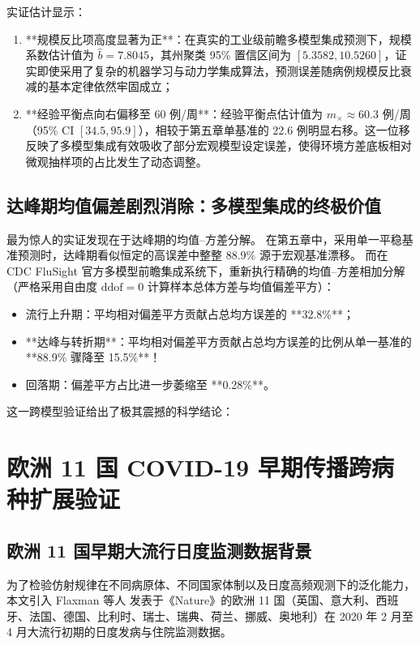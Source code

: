 实证估计显示：
\begin{enumerate}[label=(\arabic*)]
    \item **规模反比项高度显著为正**：在真实的工业级前瞻多模型集成预测下，规模系数估计值为 $\hat{b} = 7.8045$，其州聚类 95\% 置信区间为 $[5.3582, 10.5260]$，证实即使采用了复杂的机器学习与动力学集成算法，预测误差随病例规模反比衰减的基本定律依然牢固成立；
    \item **经验平衡点向右偏移至 60 例/周**：经验平衡点估计值为 $m_\times \approx 60.3$ 例/周（95\% CI $[34.5, 95.9]$），相较于第五章单基准的 22.6 例明显右移。这一位移反映了多模型集成有效吸收了部分宏观模型设定误差，使得环境方差底板相对微观抽样项的占比发生了动态调整。
\end{enumerate}

\subsection{达峰期均值偏差剧烈消除：多模型集成的终极价值}
最为惊人的实证发现在于达峰期的均值--方差分解。
在第五章中，采用单一平稳基准预测时，达峰期看似恒定的高误差中整整 88.9\% 源于宏观基准漂移。
而在 CDC FluSight 官方多模型前瞻集成系统下，重新执行精确的均值--方差相加分解（严格采用自由度 $\text{ddof} = 0$ 计算样本总体方差与均值偏差平方）：
\begin{itemize}
    \item 流行上升期：平均相对偏差平方贡献占总均方误差的 **32.8\%**；
    \item **达峰与转折期**：平均相对偏差平方贡献占总均方误差的比例从单一基准的 **88.9\% 骤降至 15.5\%**！
    \item 回落期：偏差平方占比进一步萎缩至 **0.28\%**。
\end{itemize}

这一跨模型验证给出了极其震撼的科学结论：
\begin{center}
\end{center}

\section{欧洲 11 国 COVID-19 早期传播跨病种扩展验证}\label{sec:covid11}

\subsection{欧洲 11 国早期大流行日度监测数据背景}
为了检验仿射规律在不同病原体、不同国家体制以及日度高频观测下的泛化能力，本文引入 Flaxman 等人 \citep{flaxman2020estimating} 发表于《Nature》的欧洲 11 国（英国、意大利、西班牙、法国、德国、比利时、瑞士、瑞典、荷兰、挪威、奥地利）在 2020 年 2 月至 4 月大流行初期的日度发病与住院监测数据。

